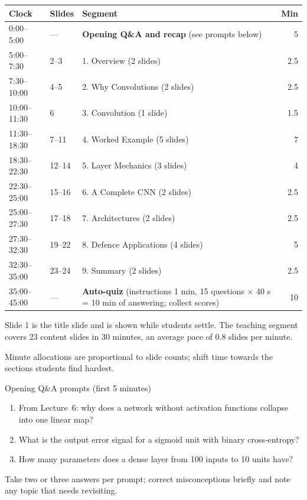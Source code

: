 \documentclass[11pt]{article}
\begin{document}
\begin{center}\small\renewcommand{\arraystretch}{1.2}\begin{tabularx}{\textwidth}{@{}l l X r@{}}\toprule\textbf{Clock} & \textbf{Slides} & \textbf{Segment} & \textbf{Min}\\\midrule

0:00--5:00 & --- & \textbf{Opening Q\&A and recap} (see prompts below) & 5\\

5:00--7:30 & 2--3 & 1. Overview (2 slides) & 2.5\\

7:30--10:00 & 4--5 & 2. Why Convolutions (2 slides) & 2.5\\

10:00--11:30 & 6 & 3. Convolution (1 slide) & 1.5\\

11:30--18:30 & 7--11 & 4. Worked Example (5 slides) & 7\\

18:30--22:30 & 12--14 & 5. Layer Mechanics (3 slides) & 4\\

22:30--25:00 & 15--16 & 6. A Complete CNN (2 slides) & 2.5\\

25:00--27:30 & 17--18 & 7. Architectures (2 slides) & 2.5\\

27:30--32:30 & 19--22 & 8. Defence Applications (4 slides) & 5\\

32:30--35:00 & 23--24 & 9. Summary (2 slides) & 2.5\\

35:00--45:00 & --- & \textbf{Auto-quiz} (instructions 1 min, 15 questions $\times$ 40 s = 10 min of answering; collect scores) & 10\\\bottomrule\end{tabularx}\end{center}

Slide 1 is the title slide and is shown while students settle. The teaching segment covers 23 content slides in 30 minutes, an average pace of 0.8 slides per minute. 

Minute allocations are proportional to slide counts; shift time towards the sections students find hardest.

\begin{instr}{Opening Q\&A prompts (first 5 minutes)}\begin{enumerate}\item From Lecture~6: why does a network without activation functions collapse into one linear map?\item What is the output error signal for a sigmoid unit with binary cross-entropy?\item How many parameters does a dense layer from 100 inputs to 10 units have?\end{enumerate}Take two or three answers per prompt; correct misconceptions briefly and note any topic that needs revisiting.\end{instr}
\end{document}
